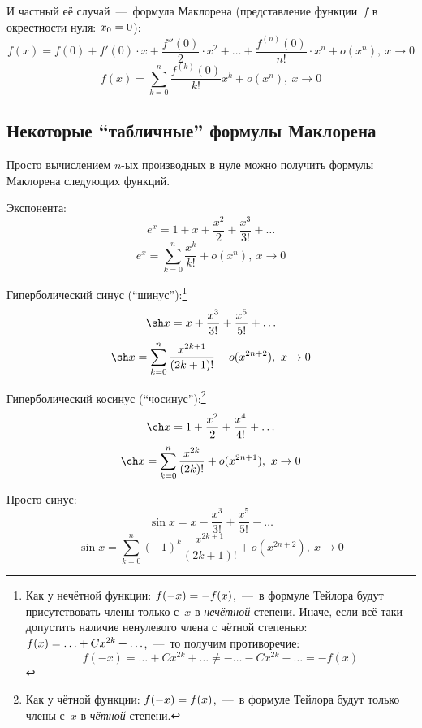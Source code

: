\documentclass[a4paper,12pt]{article}
\begin{document}
  И частный её случай~---~формула Маклорена (представление функции~$f$ в окрестности нуля: $x_0 \hm= 0$):
  \[
    f(x) = f(0) + f'(0) \cdot x + \frac{f''(0)}{2} \cdot x^2 + \ldots + \frac{f^{(n)}(0)}{n!} \cdot x^n + o(x^n),\ x \to 0
  \]
  \begin{equation}\label{eq:maclore}
    f(x) = \sum_{k = 0}^n \frac{f^{(k)}(0)}{k!} x^k + o(x^n),\ x \to 0
  \end{equation}


  \subsection{Некоторые ``табличные'' формулы Маклорена}

  Просто вычислением $n$-ых производных в нуле можно получить формулы Маклорена следующих функций.

  Экспонента:
  \[
    e^x = 1 + x + \frac{x^2}{2} + \frac{x^3}{3!} + \ldots
  \]
  \begin{equation}\label{eq:exp}
    e^x = \sum_{k = 0}^n \frac{x^k}{k!} + o(x^n),\ x \to 0
  \end{equation}

  Гиперболический синус (``шинус''):\footnote{
    Как у нечётной функции: $f(-x) \hm= -f(x)$,~---~в формуле Тейлора будут присутствовать члены только с~$x$ в \emph{нечётной} степени.
    Иначе, если всё-таки допустить наличие ненулевого члена с чётной степенью: $f(x) \hm= \ldots \hm+ C x^{2k} \hm+ \ldots$,~---~то получим противоречие:
    \[
      f(-x) = \ldots + C x^{2k} + \ldots \not= -\ldots - C x^{2k} - \ldots = -f(x)
    \]
  }
  \[
    \sh x = x + \frac{x^3}{3!} + \frac{x^5}{5!} + \ldots
  \]
  \begin{equation}\label{eq:sh}
    \sh x = \sum_{k = 0}^n \frac{x^{2k + 1}}{(2k + 1)!} + o(x^{2n + 2}),\ x \to 0
  \end{equation}

  Гиперболический косинус (``чосинус''):\footnote{
    Как у чётной функции: $f(-x) \hm= f(x)$,~---~в формуле Тейлора будут только члены с~$x$ в \emph{чётной} степени.
  }
  \[
    \ch x = 1 + \frac{x^2}{2} + \frac{x^4}{4!} + \ldots
  \]
  \begin{equation}\label{eq:ch}
    \ch x = \sum_{k = 0}^n \frac{x^{2k}}{(2k)!} + o(x^{2n + 1}),\ x \to 0
  \end{equation}

  Просто синус:
  \[
    \sin x = x - \frac{x^3}{3!} + \frac{x^5}{5!} - \ldots
  \]
  \begin{equation}\label{eq:sin}
    \sin x = \sum_{k = 0}^n (-1)^{k} \frac{x^{2k + 1}}{(2k + 1)!} + o(x^{2n + 2}),\ x \to 0
  \end{equation}
\end{document}
